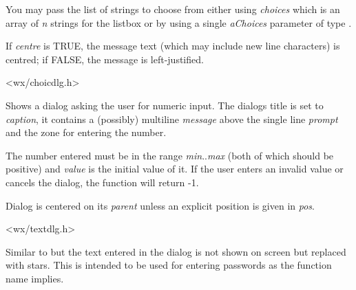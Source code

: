 You may pass the list of strings to choose from either using {\it choices}
which is an array of {\it n} strings for the listbox or by using a single
{\it aChoices} parameter of type .

If {\it centre} is TRUE, the message text (which may include new line
characters) is centred; if FALSE, the message is left-justified.


<wx/choicdlg.h>


\label{wxgetnumberfromuser}


Shows a dialog asking the user for numeric input. The dialogs title is set to
{\it caption}, it contains a (possibly) multiline {\it message} above the
single line {\it prompt} and the zone for entering the number.

The number entered must be in the range {\it min}..{\it max} (both of which
should be positive) and {\it value} is the initial value of it. If the user
enters an invalid value or cancels the dialog, the function will return -1.

Dialog is centered on its {\it parent} unless an explicit position is given in
{\it pos}.


<wx/textdlg.h>

\label{wxgetpasswordfromuser}


Similar to  but the text entered
in the dialog is not shown on screen but replaced with stars. This is intended
to be used for entering passwords as the function name implies.

